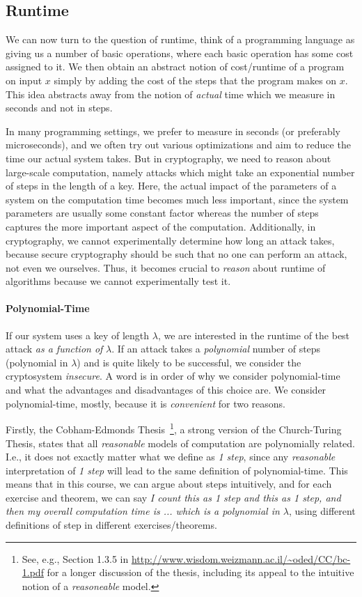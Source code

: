 
\subsection{Runtime}\label{ssec:runtime}
We can now turn to the question of runtime, think of a programming language as giving us a number of basic operations, where each basic operation has some cost assigned to it. We then obtain an abstract notion of cost/runtime of a program on input $x$ simply by adding the cost of the steps that the program makes on $x$. This idea abstracts away from the notion of \emph{actual} time which we measure in seconds and not in steps.

In many programming settings, we prefer to measure in seconds (or preferably microseconds), and we often try out various optimizations and aim to reduce the time our actual system takes. But in cryptography, we need to reason about large-scale computation, namely attacks which might take an exponential number of steps in the length of a key. Here, the actual impact of the parameters of a system on the computation time becomes much less important, since the system parameters are usually some constant factor whereas the number of steps captures the more important aspect of the computation. Additionally, in cryptography, we cannot experimentally determine how long an attack takes, because secure cryptography should be such that no one can perform an attack, not even we ourselves. Thus, it becomes crucial to \emph{reason} about runtime of algorithms because we cannot experimentally test it.

\paragraph{Polynomial-Time} If our system uses a key of length $\lambda$, we are interested in the runtime of the best attack \emph{as a function of} $\lambda$. If an attack takes a \emph{polynomial} number of steps (polynomial in $\lambda$) and is quite likely to be successful, we consider the cryptosystem \emph{insecure}. A word is in order of why we consider polynomial-time and what the advantages and disadvantages of this choice are. We consider polynomial-time, mostly, because it is \emph{convenient} for two reasons.

Firstly, the Cobham-Edmonds Thesis~\footnote{See, e.g., Section 1.3.5 in \url{http://www.wisdom.weizmann.ac.il/~oded/CC/bc-1.pdf} for a longer discussion of the thesis, including its appeal to the intuitive notion of a \emph{reasoneable} model.}, a strong version of the Church-Turing Thesis, states that all \emph{reasonable} models of computation are polynomially related. I.e., it does not exactly matter what we define as \emph{1 step}, since any \emph{reasonable} interpretation of \emph{1 step} will lead to the same definition of polynomial-time. This means that in this course, we can argue about steps intuitively, and for each exercise and theorem, we can say \emph{I count this as 1 step and this as 1 step, and then my overall computation time is ... which is a polynomial in $\lambda$}, using different definitions of step in different exercises/theorems.

